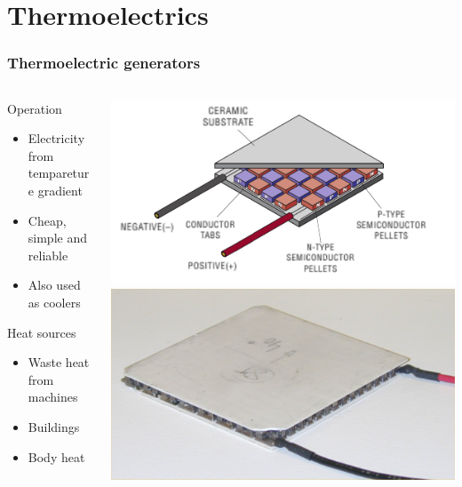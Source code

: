 \documentclass{beamer}
\begin{document}
\section{Thermoelectrics}

\begin{frame}
  \frametitle{Thermoelectric generators}
\begin{columns}
 

\begin{column}{.6\textwidth}
\begin{block}{Operation}
\begin{itemize}
  \item Electricity from tempareture gradient
  \item Cheap, simple and reliable
  \item Also used as coolers
\end{itemize}
\end{block}

\begin{block}{Heat sources}
  \begin{itemize}
    \item Waste heat from machines
    \item Buildings
    \item Body heat
  \end{itemize}
\end{block}

\end{column}
\begin{column}{.35\textwidth}
 \includegraphics[width=\textwidth]{./Slike/TEG-shema} \\
 \includegraphics[width=\textwidth]{./Slike/TEG-slika}
\end{column}


\end{columns}
\end{frame}
\end{document}
